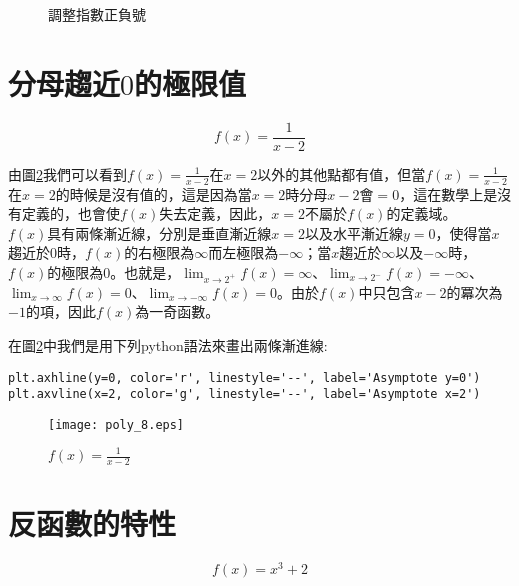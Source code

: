 \documentclass[12pt, a4paper]{article}
\begin{document}
\begin{figure}[h]
\centering
{}
\caption{調整指數正負號}
\label{fig:parallel2_4}
\end{figure}

\section{分母趨近\;$0$\;的極限值}
\begin{equation}\label{eq:equation_4}
f(x)=\frac{1}{x-2}
\end{equation}

由圖\;\ref{fig:poly_8.eps}\;我們可以看到\;$f(x)=\frac{1}{x-2}$\;在\;$x=2$\;以外的其他點都有值，但當$f(x)=\frac{1}{x-2}$\;在\;$x=2$\;的時候是沒有值的，這是因為當\;$x=2$\;時分母\;$x-2$\;會\;$=0$\;，這在數學上是沒有定義的，也會使\;$f(x)$\;失去定義，因此，\;$x=2$\;不屬於\;$f(x)$\;的定義域。\\
\;$f(x)$\;具有兩條漸近線，分別是垂直漸近線\;$x=2$\;以及水平漸近線\;$y=0$\;，使得當\;$x$\;趨近於\;$0$\;時，\;$f(x)$\;的右極限為\;$\infty$\;而左極限為\;$- \infty$\;；當\;$x$\;趨近於\;$\infty$\;以及\;$- \infty$\;時，\;$f(x)$\;的極限為\;$0$\;。也就是，\;$\lim_{x\rightarrow 2^{+}} f(x) = \infty$\;、\;$\lim_{x\rightarrow 2^{-}} f(x) = - \infty$\;、\;$\lim_{x\rightarrow \infty} f(x) = 0$\;、\;$\lim_{x\rightarrow - \infty} f(x) = 0$\;。由於\;$f(x)$\;中只包含\;$x-2$\;的冪次為\;$-1$\;的項，因此\;$f(x)$\;為一奇函數。

在圖\;\ref{fig:poly_8.eps}\;中我們是用下列python語法來畫出兩條漸進線\;:
\begin{lstlisting}
plt.axhline(y=0, color='r', linestyle='--', label='Asymptote y=0')
plt.axvline(x=2, color='g', linestyle='--', label='Asymptote x=2')
\end{lstlisting}

\begin{figure}[h]
\centering
\texttt{[image: poly\_8.eps]}
\caption{$f(x)=\frac{1}{x-2}$}
\label{fig:poly_8.eps}
\end{figure}

\section{反函數的特性}
\begin{equation}\label{eq:equation_5}
f(x)=x^3+2
\end{equation}
\end{document}
